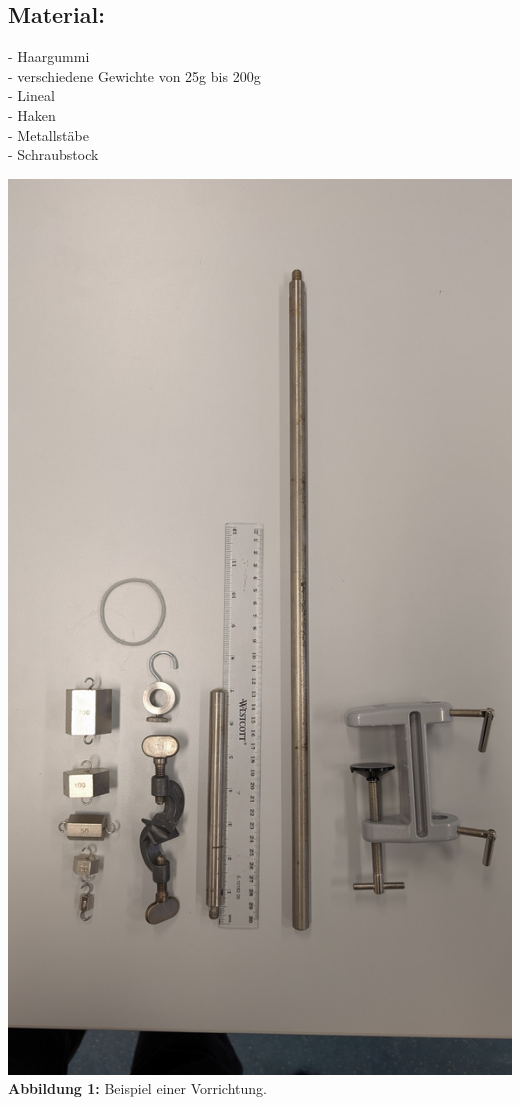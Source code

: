 \documentclass[11pt]{article}
\begin{document}
    \subsection{Material:}
    \noindent\begin{minipage}{0.6\textwidth}\raggedright
    - Haargummi\\
    - verschiedene Gewichte von 25g bis 200g\\
    - Lineal\\
    - Haken\\
    - Metallstäbe\\
    - Schraubstock\\
    \end{minipage}%
    \hfill%
    \begin{minipage}{0.3\textwidth}
    \centering
    \includegraphics[width=0.95\linewidth]{PXL_20250107_141138099.jpg}
    \vspace{0.5em} %
    \textbf{Abbildung 1:} Beispiel einer Vorrichtung. %
    \end{minipage}
\end{document}

